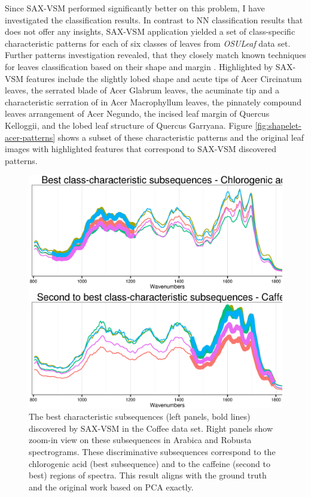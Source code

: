Since SAX-VSM performed significantly better on this problem, I have investigated the classification results.
In contrast to NN classification results that does not offer any insights, SAX-VSM application yielded a set of 
class-specific characteristic patterns for each of six classes of leaves from \textit{OSULeaf} data set. 
Further patterns investigation revealed, that they closely match known techniques for leaves classification based 
on their shape and margin \cite{citeulike:12134192}. 
Highlighted by SAX-VSM features include 
the slightly lobed shape and acute tips of Acer Circinatum leaves, 
the serrated blade of Acer Glabrum leaves, 
the acuminate tip and a characteristic serration of in Acer Macrophyllum leaves, 
the pinnately compound leaves arrangement of Acer Negundo, 
the incised leaf margin of Quercus Kelloggii, 
and the lobed leaf structure of Quercus Garryana. 
Figure \ref{fig:shapelet-acer-patterns} shows a subset of these characteristic patterns and the original
leaf images with highlighted features that correspond to SAX-VSM discovered patterns.

\begin{figure}[!h!t]
   \centering
   \includegraphics[width=120mm]{figures/coffee_patterns.ps}
   \caption{
   The best characteristic subsequences (left panels, bold lines) discovered by SAX-VSM in
   the {Coffee data set}. Right panels show zoom-in view on these subsequences in Arabica
   and Robusta spectrograms.
   These discriminative subsequences correspond to the chlorogenic acid (best subsequence) 
   and to the caffeine (second to best) regions of spectra. This result aligns with
   the ground truth and the original work based on PCA \cite{citeulike:12550833} exactly.  }
   \label{fig:coffee}
\end{figure}

